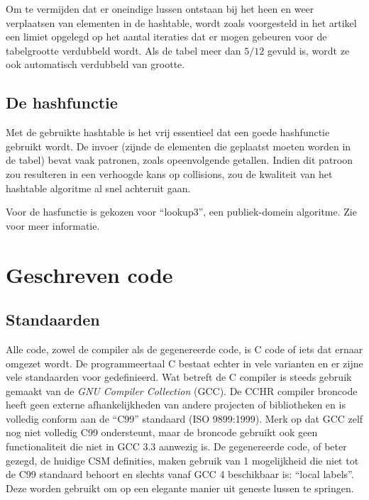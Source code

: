 {Om te vermijden dat er oneindige lussen ontstaan bij het heen en weer verplaatsen van elementen in de hashtable, wordt zoals voorgesteld in het artikel een limiet opgelegd op het aantal iteraties dat er mogen gebeuren voor de tabelgrootte verdubbeld wordt. Als de tabel meer dan $5/12$ gevuld is, wordt ze ook automatisch verdubbeld van grootte.

\subsection{De hashfunctie} \label{sec:hashfunc}

Met de gebruikte hashtable is het vrij essentieel dat een goede hashfunctie gebruikt wordt. De invoer (zijnde de elementen die geplaatst moeten worden in de tabel) bevat vaak patronen, zoals opeenvolgende getallen. Indien dit patroon zou resulteren in een verhoogde kans op collisions, zou de kwaliteit van het hashtable algoritme al snel achteruit gaan.

Voor de hasfunctie is gekozen voor ``lookup3'', een publiek-domein algoritme. Zie \cite{hashing} voor meer informatie.

\section{Geschreven code} \label{sec:correctheid}

\subsection{Standaarden} \label{sec:standards}

Alle code, zowel de compiler als de gegenereerde code, is C code of iets dat ernaar omgezet wordt. De programmeertaal C bestaat echter in vele varianten en er zijne vele standaarden voor gedefinieerd. Wat betreft de C compiler is steeds gebruik gemaakt van de {\em GNU Compiler Collection} (GCC). De CCHR compiler broncode heeft geen externe afhankelijkheden van andere projecten of bibliotheken en is volledig conform aan de ``C99'' standaard (ISO 9899:1999). Merk op dat GCC zelf nog niet volledig C99 ondersteunt, maar de broncode gebruikt ook geen functionaliteit die niet in GCC 3.3 aanwezig is. De gegenereerde code, of beter gezegd, de huidige CSM definities, maken gebruik van 1 mogelijkheid die niet tot de C99 standaard behoort en slechts vanaf GCC 4 beschikbaar is: ``local labels''. Deze worden gebruikt om op een elegante manier uit geneste lussen te springen.

}
